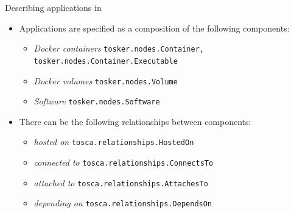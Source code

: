 \documentclass{beamer}
\begin{document}
  \begin{frame}{Describing applications in \dt}
    \begin{itemize}
      \item Applications are specified as a composition of the following components:\begin{itemize}
          \item \small\emph{Docker containers} {\tiny\texttt{tosker.nodes.Container, tosker.nodes.Container.Executable}}
          \item \small\emph{Docker volumes} {\tiny\texttt{tosker.nodes.Volume}}
          \item \small\emph{Software} {\tiny\texttt{tosker.nodes.Software}}
        \end{itemize}\pause
      \item There can be the following relationships between components:\begin{itemize}
          \item \small\emph{hosted on} {\tiny\texttt{tosca.relationships.HostedOn}}
          \item \small\emph{connected to} {\tiny\texttt{tosca.relationships.ConnectsTo}}
          \item \small\emph{attached to} {\tiny\texttt{tosca.relationships.AttachesTo}}
          \item \small\emph{depending on} {\tiny\texttt{tosca.relationships.DependsOn}}
        \end{itemize}
    \end{itemize}
  \end{frame}
\end{document}
